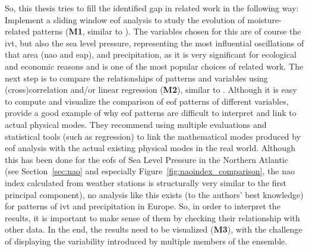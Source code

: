 So, this thesis tries to fill the identified gap in related work in the following way:
Implement a sliding window \ac{eof} analysis to study the evolution of moisture-related patterns (\textbf{M1}, similar to \cite{vietinghoffdiss, zou_interdecadal_2018}). 
The variables chosen for this are of course the \ac{ivt}, but also the sea level pressure, representing the most influential oscillations of that area (\ac{nao} and \ac{eap}), and precipitation, as it is very significant for ecological and economic reasons and is one of the most popular choices of related work. 
The next step is to compare the relationships of patterns and variables using (cross)correlation and/or linear regression (\textbf{M2}), similar to \cite{zou_interdecadal_2018, zou_investigating_2020, yao_simulation_2013}. 
Although it is easy to compute and visualize the comparison of \ac{eof} patterns of different variables,  provide a good example of why \ac{eof} patterns are difficult to interpret and link to actual physical modes. 
They recommend using multiple evaluations and statistical tools (such as regression) to link the mathematical modes produced by \ac{eof} analysis with the actual existing physical modes in the real world. 
Although this has been done for the \acp{eof} of Sea Level Pressure in the Northern Atlantic (see Section~\ref{sec:nao} and especially Figure~\ref{fig:naoindex_comparison}, the \ac{nao} index calculated from weather stations is structurally very similar to the first principal component), no analysis like this exists (to the authors' best knowledge) for patterns of \ac{ivt} and precipitation in Europe.  
So, in order to interpret the results, it is important to make sense of them by checking their relationship with other data. 
In the end, the results need to be visualized (\textbf{M3}), with the challenge of displaying the variability introduced by multiple members of the ensemble. 




